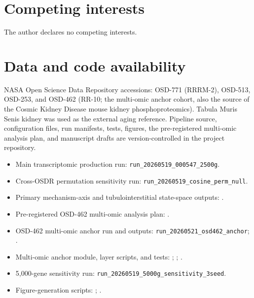 \documentclass[11pt]{article}
\newcommand{\code}[1]{\texttt{#1}}
\begin{document}
\section*{Competing interests}
The author declares no competing interests.

\section*{Data and code availability}
NASA Open Science Data Repository accessions: OSD-771 (RRRM-2), OSD-513, OSD-253, and OSD-462 (RR-10; the multi-omic anchor cohort, also the source of the Cosmic Kidney Disease mouse kidney phosphoproteomics). Tabula Muris Senis kidney was used as the external aging reference. Pipeline source, configuration files, run manifests, tests, figures, the pre-registered multi-omic analysis plan, and manuscript drafts are version-controlled in the project repository.

\begin{itemize}
  \item Main transcriptomic production run: \code{run\_20260519\_000547\_2500g}.
  \item Cross-OSDR permutation sensitivity run: \code{run\_20260519\_cosine\_perm\_null}.
  \item Primary mechanism-axis and tubulointerstitial state-space outputs: .
  \item Pre-registered OSD-462 multi-omic analysis plan: .
  \item OSD-462 multi-omic anchor run and outputs: \code{run\_20260521\_osd462\_anchor}; .
  \item Multi-omic anchor module, layer scripts, and tests: ; ; .
  \item 5,000-gene sensitivity run: \code{run\_20260519\_5000g\_sensitivity\_3seed}.
  \item Figure-generation scripts: ; .
\end{itemize}
\end{document}
